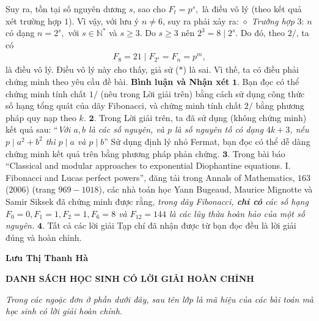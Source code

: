 \begin{multicols}{2}
	Suy ra, tồn tại số nguyên dương $s$, sao cho ${F_t} = {p^s},$ là điều vô lý (theo kết quả xét trường hợp $1$). Vì vậy, với lưu ý $n \ne 6$, suy ra phải xảy ra:
	\vskip 0.05cm
	$\diamond$ \textit{Trường hợp} $3$: $n$ có dạng $n = {2^s},$ với $s \in \mathbb{N^*}$ và $s \ge 3$.
	\vskip 0.05cm
	Do $s \ge 3$ nên  ${2^3} = 8\mid{2^s}$. Do đó, theo $2/$, ta có
	\begin{align*}
		{F_8} = 21\mid{F_{{2^s}}} = {F_n} = {p^m},
	\end{align*}
	là điều vô lý. Điều vô lý này cho thấy, giả sử ($*$) là sai. Vì thế, ta có điều phải chứng minh theo yêu cầu đề bài.
	\vskip 0.05cm
	\textbf{\color{thachthuctoanhoc}Bình luận và Nhận xét}
	\vskip 0.05cm
	$\pmb{1.}$ Bạn đọc có thể chứng minh tính chất $1/$ (nêu trong Lời giải trên) bằng cách sử dụng công thức số hạng tổng quát của dãy Fibonacci, và chứng minh tính chất $2/$ bằng phương pháp quy nạp theo $k$.
	\vskip 0.05cm
	$\pmb{2.}$ Trong Lời giải trên, ta đã sử dụng (không chứng minh) kết quả sau:
	\vskip 0.05cm
	“\textit{Với $a, b$ là các số nguyên, và $p$ là số nguyên tố có dạng $4k + 3$, nếu $p\mid{a^2} + {b^2}$  thì  $p \mid a$ và  $p \mid b$}”
	\vskip 0.05cm
	Sử dụng định lý nhỏ Fermat, bạn đọc có thể dễ dàng chứng minh kết quả trên bằng phương pháp phản chứng.
	\vskip 0.05cm
	$\pmb{3.}$ Trong bài báo “Classical and
	modular approaches to exponential Diophantine equations. I. Fibonacci and Lucas perfect powers”, đăng tải trong Annals of Mathematics, $163$ ($2006$) (trang $969 - 1018$), các nhà toán học Yann Bugeaud, Maurice Mignotte và Samir Siksek đã chứng minh được rằng, \textit{trong dãy Fibonacci, \textbf{\color{thachthuctoanhoc}chỉ có} các số hạng $F_0=0, F_1 = 1, F_2 = 1, F_6 = 8$ và $F_{12} = 144$ là các lũy thừa hoàn hảo của một số nguyên.}
	\vskip 0.05cm
	$\pmb{4.}$ Tất cả các lời giải Tạp chí đã nhận được từ bạn đọc đều là lời giải đúng và hoàn chỉnh.
	\begin{flushright}
		\textbf{\color{thachthuctoanhoc}Lưu Thị Thanh Hà}
	\end{flushright}
\end{multicols}
\centerline{\textbf{\color{thachthuctoanhoc}DANH SÁCH HỌC SINH CÓ LỜI GIẢI HOÀN CHỈNH}}
\vskip 0.1cm
\textit{Trong các ngoặc đơn ở phần dưới đây, sau tên lớp là mã hiệu của các bài toán mà học sinh có lời giải hoàn chỉnh.}
